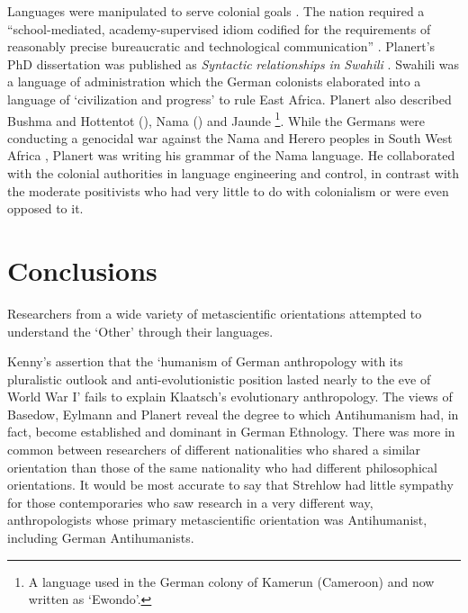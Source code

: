 \documentclass[output=paper]{langsci/langscibook}
\begin{document}
Languages were manipulated to serve colonial goals \citep[88]{errington_linguistics_2008}. The nation required a “school-mediated, academy-supervised idiom codified for the requirements of reasonably precise bureaucratic and technological communication” \citep[57]{gellner_nations_1983}. Planert’s PhD dissertation was published as \textit{Syntactic} \textit{relationships} \textit{in} \textit{Swahili} \citep{Planert1907a}. Swahili was a language of administration which the German colonists elaborated into a language of ‘civilization and progress’ to rule East Africa. Planert also described Bushma and Hottentot (\citeyear{planert_handbuch_1905}), Nama (\citeyear{planert_handbuch_1905}) and Jaunde \citep{nekes_lehrbuch_1911}\footnote{ \textrm{A language used in the German colony of Kamerun (Cameroon) and now written as ‘Ewondo’.}}. While the Germans were conducting a genocidal war against the Nama and Herero peoples in South West Africa \citep{hull_military_2005}, Planert was writing his grammar of the Nama language. He collaborated with the colonial authorities in language engineering and control, in contrast with the moderate positivists who had very little to do with colonialism or were even opposed to it. 

\section{Conclusions} 

Researchers from a wide variety of metascientific orientations attempted to understand the ‘Other’ through their languages. 

Kenny’s assertion that the ‘humanism of German anthropology with its pluralistic outlook and anti-evolutionistic position lasted nearly to the eve of World War I’ fails to explain Klaatsch’s evolutionary anthropology. The views of Basedow, Eylmann and Planert reveal the degree to which Antihumanism had, in fact, become established and dominant in German Ethnology. There was more in common between researchers of different nationalities who shared a similar orientation than those of the same nationality who had different philosophical orientations.  It would be most accurate to say that Strehlow had little sympathy for those contemporaries who saw research in a very different way, anthropologists whose primary metascientific orientation was Antihumanist, including German Antihumanists. 
\end{document}
